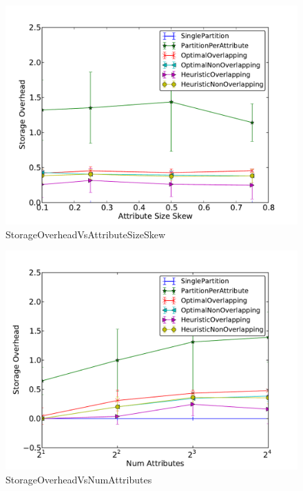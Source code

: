 \begin{figure}[ht]
\centerline{\includegraphics[width=0.9\columnwidth]{figures/StorageOverheadVsAttributeSizeSkew.pdf}}
\caption{StorageOverheadVsAttributeSizeSkew}
\end{figure}

\begin{figure}[ht]
\centerline{\includegraphics[width=0.9\columnwidth]{figures/StorageOverheadVsNumAttributes.pdf}}
\caption{StorageOverheadVsNumAttributes}
\end{figure}

